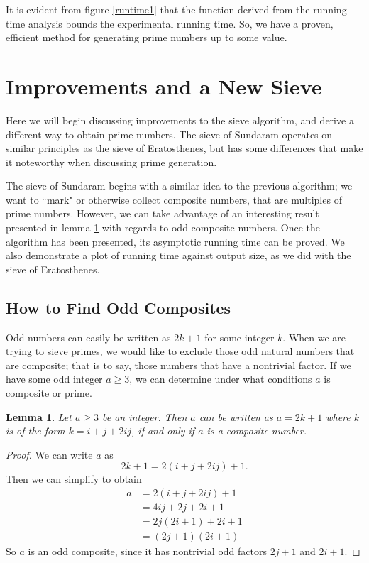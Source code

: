 \documentclass{amsart}
\newtheorem{lem}{Lemma}
\theoremstyle{definition}
\theoremstyle{case}
\begin{document}
	It is evident from figure \ref{runtime1} that the function derived from the running time analysis bounds the experimental running time. So, we have a proven, efficient method for generating prime numbers up to some value.
	
	\section{Improvements and a New Sieve}
	
	Here we will begin discussing improvements to the sieve algorithm, and derive a different way to obtain prime numbers. The sieve of Sundaram operates on similar principles as the sieve of Eratosthenes, but has some differences that make it noteworthy when discussing prime generation.
	
	The sieve of Sundaram begins with a similar idea to the previous algorithm; we want to ``mark" or otherwise collect composite numbers, that are multiples of prime numbers. However, we can take advantage of an interesting result presented in lemma \ref{ijstuff} with regards to odd composite numbers.
	Once the algorithm has been presented, its asymptotic running time can be proved. We also demonstrate a plot of running time against output size, as we did with the sieve of Eratosthenes.
	
	\subsection{How to Find Odd Composites}
	
	Odd numbers can easily be written as $2k+1$ for some integer $k$. When we are trying to sieve primes, we would like to exclude those odd natural numbers that are composite; that is to say, those numbers that have a nontrivial factor. If we have some odd integer $a\geq3$, we can determine under what conditions $a$ is composite or prime.
	
	\begin{lem}\label{ijstuff}
		Let $a\geq3$ be an integer. Then $a$ can be written as $a = 2k+1$ where $k$ is of the form $k=i+j+2ij$, if and only if $a$ is a composite number.
	\end{lem}
	\begin{proof}
		We can write $a$ as
		$$ 2k + 1 = 2(i+j+2ij) + 1 . $$
		Then we can simplify to obtain
		\begin{equation*}
		\begin{split}
		a &= 2(i+j+2ij) + 1 \\
		  &= 4ij + 2j + 2i + 1 \\
		  &= 2j(2i+1) + 2i + 1 \\
		  &= (2j+1)(2i+1)
		\end{split}
		\end{equation*}
		So $a$ is an odd composite, since it has nontrivial odd factors $2j+1$ and $2i+1$.
	\end{proof}
\end{document}
